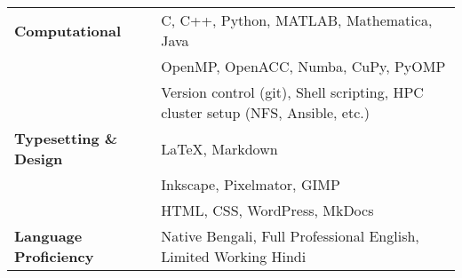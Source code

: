 \begin{longtable}[l]{@{} m{4.75cm} m{15cm}}
\textbf{Computational} & C, C++, Python, MATLAB, Mathematica, Java\\
                                  & OpenMP, OpenACC, Numba, CuPy, PyOMP\\
                                  & Version control (git), Shell scripting, HPC cluster setup (NFS, Ansible, etc.)\\[0.2cm]

\textbf{Typesetting \& Design} & \LaTeX, Markdown \\
                                                          & Inkscape, Pixelmator, GIMP\\
                                                          & HTML, CSS, WordPress, MkDocs \\[0.2cm]
                                                            
\textbf{Language Proficiency} & Native Bengali, Full Professional English,  Limited Working Hindi\\                                               
\end{longtable}